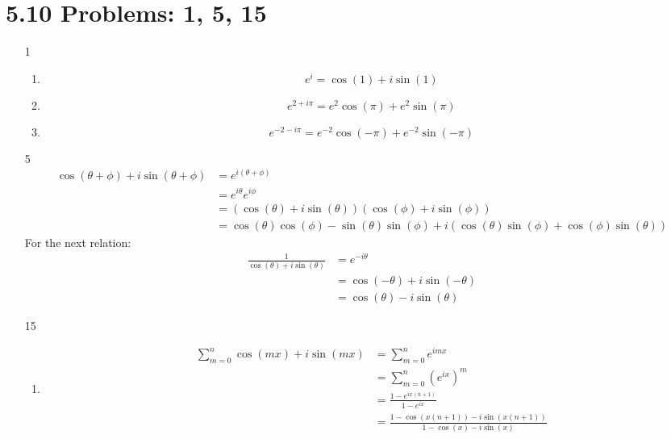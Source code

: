 \documentclass{article}
\begin{document}
  \section{5.10 Problems: 1, 5, 15}
  \begin{enumerate}
    \item[1]
      \begin{enumerate}[label=(\roman*)]
        \item\[e^i=\cos(1)+i\sin(1)\]
        \item\[e^{2+i\pi}=e^2\cos(\pi)+e^2\sin(\pi)\]
        \item\[e^{-2-i\pi}=e^{-2}\cos(-\pi)+e^{-2}\sin(-\pi)\]
      \end{enumerate}
    \item[5]
      \begin{align*}
        \cos(\theta+\phi)+i\sin(\theta+\phi)&=e^{i(\theta+\phi)}\\
        &=e^{i\theta}e^{i\phi}\\
        &=(\cos(\theta)+i\sin(\theta))(\cos(\phi)+i\sin(\phi))\\
        &=\cos(\theta)\cos(\phi)-\sin(\theta)\sin(\phi)+i(\cos(\theta)\sin(\phi)+\cos(\phi)\sin(\theta))
      \end{align*}
      For the next relation:
      \begin{align*}
        \frac{1}{\cos(\theta)+i\sin(\theta)}&=e^{-i\theta}\\
        &=\cos(-\theta)+i\sin(-\theta)\\
        &=\cos(\theta)-i\sin(\theta)
      \end{align*}
    \item[15]
      \begin{enumerate}[label=(\roman*)]
        \item
          \begin{align*}
            \sum_{m=0}^n\cos(mx)+i\sin(mx)&=\sum_{m=0}^ne^{imx}\\
            &=\sum_{m=0}^n\left(e^{ix}\right)^m\\
            &=\frac{1-e^{ix(n+1)}}{1-e^{ix}}\\
            &=\frac{1-\cos(x(n+1))-i\sin(x(n+1))}{1-\cos(x)-i\sin(x)}
          \end{align*}
      \end{enumerate}
  \end{enumerate}
\end{document}
